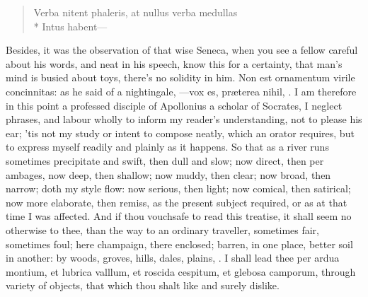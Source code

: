 {\begin{verse}
\textlatin{Verba nitent phaleris, at nullus verba medullas}\\*
\textlatin{Intus habent}---
\end{verse}

Besides, it was the observation of that wise Seneca, when you see
a fellow careful about his words, and neat in his speech, know this for
a certainty, that man's mind is busied about toys, there's no solidity
in him. Non est ornamentum virile concinnitas: as he said of a
nightingale, ---vox es, pr\ae{}terea nihil, \etc. I am therefore in this
point a professed disciple of Apollonius a scholar of Socrates, I
neglect phrases, and labour wholly to inform my reader's understanding,
not to please his ear; 'tis not my study or intent to compose neatly,
which an orator requires, but to express myself readily and plainly as
it happens. So that as a river runs sometimes precipitate and swift,
then dull and slow; now direct, then per ambages, now deep, then
shallow; now muddy, then clear; now broad, then narrow; doth my style
flow: now serious, then light; now comical, then satirical; now more
elaborate, then remiss, as the present subject required, or as at that
time I was affected. And if thou vouchsafe to read this treatise, it
shall seem no otherwise to thee, than the way to an ordinary traveller,
sometimes fair, sometimes foul; here champaign, there enclosed; barren,
in one place, better soil in another: by woods, groves, hills, dales,
plains, \etc. I shall lead thee per ardua montium, et lubrica valllum, et
roscida cespitum, et glebosa camporum, through variety of objects,
that which thou shalt like and surely dislike.

}
